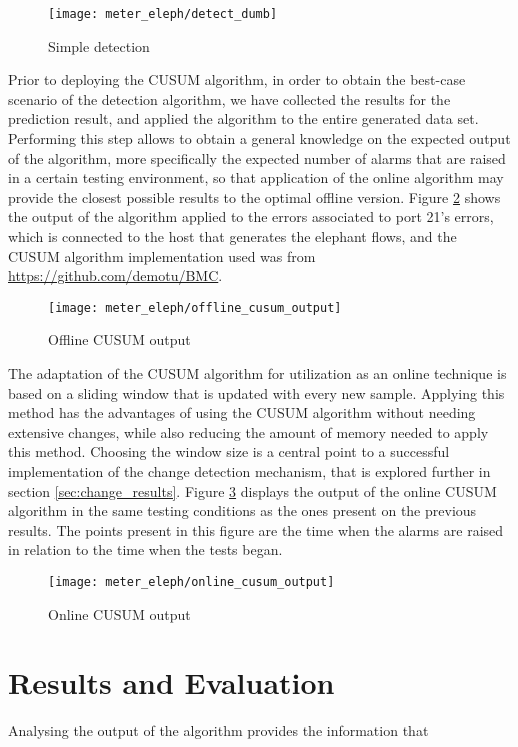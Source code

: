 \begin{figure}[H]
    \centering
    \texttt{[image: meter\_eleph/detect\_dumb]}
    \caption {Simple detection}
    \label{fig:detect_dumb}
\end{figure} 

\par Prior to deploying the CUSUM algorithm, in order to obtain the best-case scenario of the detection algorithm, we have collected the results for the prediction result, and applied the algorithm to the entire generated data set. Performing this step allows
to obtain a general knowledge on the expected output of the algorithm, more specifically the expected number of alarms that are raised in a certain testing environment, so that application of the online algorithm may provide the closest possible results to the
optimal offline version. Figure  \ref{fig:offline_cusum} shows the output of the algorithm applied to the errors associated to port 21's errors, which is connected to the host that generates the elephant flows, and the CUSUM algorithm implementation used was from 
\url{https://github.com/demotu/BMC}.

\begin{figure} [H]
    \centering
    \texttt{[image: meter\_eleph/offline\_cusum\_output]}
    \caption {Offline CUSUM output}
    \label{fig:offline_cusum}
\end{figure} 

\par The adaptation of the CUSUM algorithm for utilization as an online technique is based on a sliding window that is updated with every new sample. Applying this method has the advantages of using the CUSUM algorithm without needing
extensive changes, while also reducing the amount of memory needed to apply this method. Choosing the window size is a central point to a successful implementation of the change detection mechanism, that is explored further in section
\ref{sec:change_results}. Figure \ref{fig:online_cusum} displays the output of the online CUSUM algorithm in the same testing conditions as the ones present on the previous results. The points present in this figure are the time when
the alarms are raised in relation to the time when the tests began.

\begin{figure} [H]
    \centering
    \texttt{[image: meter\_eleph/online\_cusum\_output]}
    \caption {Online CUSUM output}
    \label{fig:online_cusum}
\end{figure} 

\section {Results and Evaluation} \label{sec:change_result}

Analysing the output of the algorithm provides the information that 
